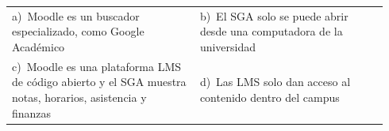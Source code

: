 \documentclass[11pt,a4paper]{article}
\begin{document}
\begin{enumerate}[label=\textbf{\arabic*.},leftmargin=*,itemsep=6pt,topsep=0pt]
\begin{minipage}[t]{\linewidth}
\vspace{4pt}
\begin{tabular}{@{}>{\raggedright\arraybackslash}p{0.47\linewidth}>{\raggedright\arraybackslash}p{0.47\linewidth}@{}}
a)~Moodle es un buscador especializado, como Google Académico & b)~El SGA solo se puede abrir desde una computadora de la universidad \\
c)~Moodle es una plataforma LMS de código abierto y el SGA muestra notas, horarios, asistencia y finanzas & d)~Las LMS solo dan acceso al contenido dentro del campus \\
\end{tabular}
\end{minipage}

\end{enumerate}
\end{document}

